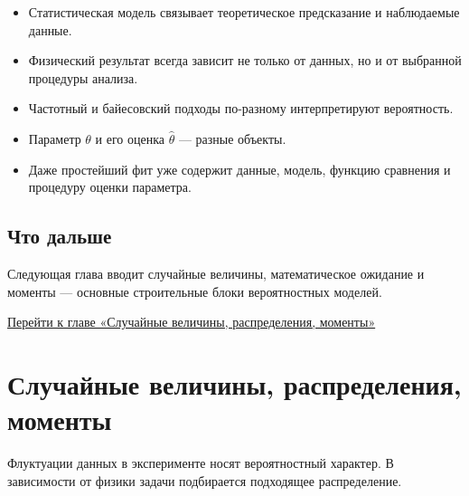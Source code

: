 \documentclass[
  russian,
  12pt,
  a4paper,
  a4paper,
  openany]{scrbook}
\providecommand{\tightlist}{%
  \setlength{\itemsep}{0pt}\setlength{\parskip}{0pt}}
\begin{document}
\begin{bookchaptersummary}

\begin{itemize}
\tightlist
\item
  Статистическая модель связывает теоретическое предсказание и
  наблюдаемые данные.
\item
  Физический результат всегда зависит не только от данных, но и от
  выбранной процедуры анализа.
\item
  Частотный и байесовский подходы по-разному интерпретируют вероятность.
\item
  Параметр \(\theta\) и его оценка \(\widehat{\theta}\) --- разные
  объекты.
\item
  Даже простейший фит уже содержит данные, модель, функцию сравнения и
  процедуру оценки параметра.
\end{itemize}

\end{bookchaptersummary}

\section{Что
дальше}\label{ux447ux442ux43e-ux434ux430ux43bux44cux448ux435}

Следующая глава вводит случайные величины, математическое ожидание и
моменты --- основные строительные блоки вероятностных моделей.

\begin{booknextchapter}

\href{01_random_distributions.qmd}{Перейти к главе «Случайные величины,
распределения, моменты»}

\end{booknextchapter}

\chapter{Случайные величины, распределения,
моменты}\label{ux441ux43bux443ux447ux430ux439ux43dux44bux435-ux432ux435ux43bux438ux447ux438ux43dux44b-ux440ux430ux441ux43fux440ux435ux434ux435ux43bux435ux43dux438ux44f-ux43cux43eux43cux435ux43dux442ux44b}

\begin{bookchapteropening}

Флуктуации данных в эксперименте носят вероятностный характер. В
зависимости от физики задачи подбирается подходящее распределение.

\end{bookchapteropening}
\end{document}
